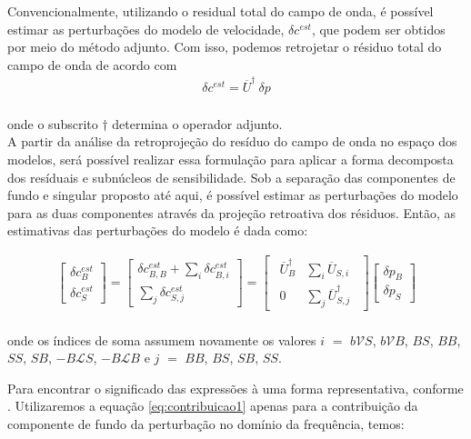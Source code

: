Convencionalmente, utilizando o residual total do campo de onda, é possível estimar as perturbações do modelo de velocidade, $\delta c^{est}$, que podem ser obtidos por meio do método adjunto. Com isso, podemos retrojetar o résiduo total do campo de onda de acordo com
\begin{eqnarray}
 \delta c^{est} = \overline{U}^{\dagger}~\delta p
\end{eqnarray}
\\
onde o subscrito $\dagger$ determina o operador adjunto. \\

A partir da análise da retroprojeção do resíduo do campo de onda no espaço dos modelos, será possível realizar essa formulação para aplicar a forma decomposta dos resíduais e subnúcleos de sensibilidade. Sob a separação das componentes de fundo e singular proposto até aqui, é possível estimar as perturbações do modelo para as duas componentes através da projeção retroativa dos résiduos. Então, as estimativas das perturbações do modelo é dada como:

 \begin{eqnarray}
 \begin{bmatrix}
   \delta c^{est}_{B}  \\
   \delta c^{est}_{S}
\end{bmatrix}
=
\begin{bmatrix}
   \delta c^{est}_{B,B} + \sum_{i} \delta c^{est}_{B,i}  \\
      \sum_{j}  \delta c^{est}_{S,j}
\end{bmatrix}
=
\begin{bmatrix}
~~\overline{U}^{\dagger}_{B}      &  \sum_{i} \overline{U}_{S,i}~~    \\ 
~~ 0  & \sum_{j}\overline{U}^{\dagger}_{S,j}~~
\end{bmatrix}
\begin{bmatrix}
    {\delta p}_{B}  \\
   {\delta p}_{S}
\end{bmatrix}
\label{sistema_perturbacao}
\end{eqnarray}
\\
onde os índices de soma assumem novamente os valores $i$ $=$ $b\mathcal{V}S$, $b\mathcal{V}B$, $BS$, $BB$, $SS$, $SB$,      $−B\mathcal{L}S$, $−B\mathcal{L}B$ e $j$ $=$ $BB$, $BS$, $SB$, $SS$.

Para encontrar o significado das expressões à uma forma representativa, conforme \citep{tarantola_linearized_1984,liu_improved_2015}. Utilizaremos a equação \ref{eq:contribuicao1} apenas para a contribuição da componente de fundo da perturbação no domínio da frequência, temos:

